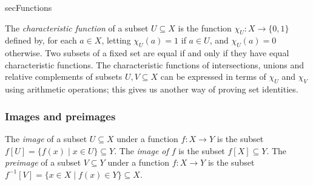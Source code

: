 \begin{tldr}{secFunctions}
\begin{tldrlist}
 The \textit{characteristic function} of a subset $U \subseteq X$ is the function $\chi_U : X \to \{ 0, 1 \}$ defined by, for each $a \in X$, letting $\chi_U(a) = 1$ if $a \in U$, and $\chi_U(a) = 0$ otherwise.
 Two subsets of a fixed set are equal if and only if they have equal characteristic functions.
 The characteristic functions of intersections, unions and relative complements of subsets $U,V \subseteq X$ can be expressed in terms of $\chi_U$ and $\chi_V$ using arithmetic operations; this gives us another way of proving set identities.
\end{tldrlist}

\subsubsection*{Images and preimages}

\begin{tldrlist}
 The \textit{image} of a subset $U \subseteq X$ under a function $f : X \to Y$ is the subset $f[U] = \{ f(x) \mid x \in U \} \subseteq Y$. The \textit{image of $f$} is the subset $f[X] \subseteq Y$.
 The \textit{preimage} of a subset $V \subseteq Y$ under a function $f : X \to Y$ is the subset $f^{-1}[V] = \{ x \in X \mid f(x) \in Y \} \subseteq X$.
\end{tldrlist}

\end{tldr}


